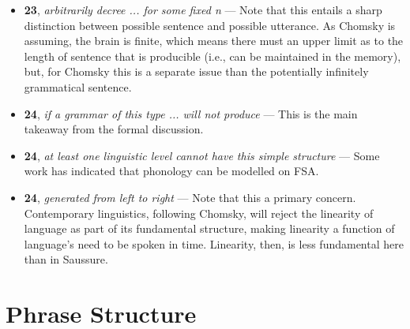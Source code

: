 \documentclass[12pt]{article}
\begin{document}
\begin{itemize}
\item \textbf{23}, \textit{arbitrarily decree ... for some fixed n} --- Note that this entails a sharp distinction between possible sentence and possible utterance. As Chomsky is assuming, the brain is finite, which means there must an upper limit as to the length of sentence that is producible (i.e., can be maintained in the memory), but, for Chomsky this is a separate issue than the potentially infinitely grammatical sentence.

\item \textbf{24}, \textit{if a grammar of this type ... will not produce} --- This is the main takeaway from the formal discussion.

\item \textbf{24}, \textit{at least one linguistic level cannot have this simple structure} --- Some work has indicated that phonology can be modelled on FSA.

\item \textbf{24}, \textit{generated from left to right} --- Note that this a primary concern. Contemporary linguistics, following Chomsky, will reject the linearity of language as part of its fundamental structure, making linearity a function of language's need to be spoken in time. Linearity, then, is less fundamental here than in Saussure.

\end{itemize}

\section{Phrase Structure}
\end{document}
